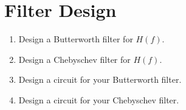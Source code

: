 \documentclass[journal,12pt,twocolumn]{IEEEtran}
\renewcommand\thesection{\arabic{section}}
\begin{document}
\section{Filter Design}
\begin{enumerate}[label=\thesection.\arabic*
,ref=\thesection.\theenumi]
\item Design a Butterworth filter for $H(f)$.
\item Design a Chebyschev filter for $H(f)$.
\item Design a circuit for your Butterworth filter.
\item Design a circuit for your Chebyschev filter.
\end{enumerate}
\end{document}
